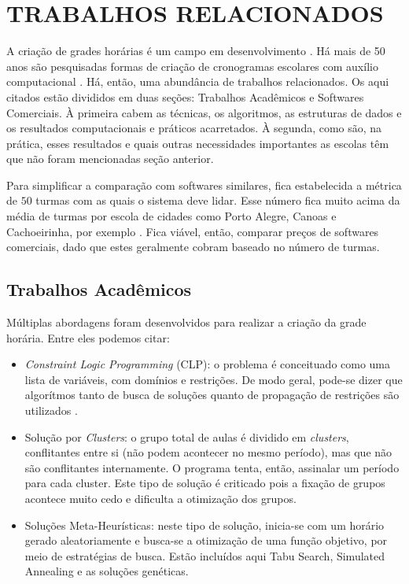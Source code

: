 \documentclass[12pt,a4paper]{article}
\begin{document}
	\section{TRABALHOS RELACIONADOS}

		\par A criação de grades horárias é um campo em desenvolvimento \cite{patat2020}. Há mais de 50 anos são pesquisadas formas de criação de cronogramas escolares com auxílio computacional \cite{appleby}. Há, então, uma abundância de trabalhos relacionados. Os aqui citados estão divididos em duas seções: Trabalhos Acadêmicos e Softwares Comerciais. À primeira cabem as técnicas, os algoritmos, as estruturas de dados e os resultados computacionais e práticos acarretados. À segunda, como são, na prática, esses resultados e quais outras necessidades importantes as escolas têm que não foram mencionadas seção anterior.

		\par Para simplificar a comparação com softwares similares, fica estabelecida a métrica de $50$ turmas com as quais o sistema deve lidar. Esse número fica muito acima da média de turmas por escola de cidades como Porto Alegre, Canoas e Cachoeirinha, por exemplo \cite{inep}. Fica viável, então, comparar preços de softwares comerciais, dado que estes geralmente cobram baseado no número de turmas.


		\subsection{Trabalhos Acadêmicos}

			\par Múltiplas abordagens foram desenvolvidos para realizar a criação da grade horária. Entre eles podemos citar:

			\begin{itemize}
				\item \textit{Constraint Logic Programming} (CLP): o problema é conceituado como uma lista de variáveis, com domínios e restrições. \cite{badoni} De modo geral, pode-se dizer que algorítmos tanto de busca de soluções quanto de propagação de restrições são utilizados \cite{citar_alguém}.
				\item Solução por \textit{Clusters}: o grupo total de aulas é dividido em \textit{clusters}, conflitantes entre si (não podem acontecer no mesmo período), mas que não são conflitantes internamente. O programa tenta, então, assinalar um período para cada cluster. Este tipo de solução é criticado pois a fixação de grupos acontece muito cedo e dificulta a otimização dos grupos. \cite{muller}
				\item Soluções Meta-Heurísticas: neste tipo de solução, inicia-se com um horário gerado aleatoriamente e busca-se a otimização de uma função objetivo, por meio de estratégias de busca. Estão incluídos aqui Tabu Search, Simulated Annealing e as soluções genéticas.
			\end{itemize}
\end{document}
